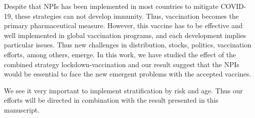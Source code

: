 Despite that NPIs has been implemented in most countries to mitigate COVID-19,
these strategies can not develop immunity.
Thus, vaccination becomes the primary pharmaceutical measure. However, this
vaccine has to be effective and well implemented in global vaccination
programs, and each development implies particular issues. Thus new challenges
in distribution, stocks, politics, vaccination efforts, among others, emerge.
In this work, we have studied the effect of the combined strategy
lockdown-vaccination and our result suggest that the NPIs would be essential to
face the new emergent problems with the accepted vaccines.

We see it very important to implement stratification by risk and age. Thus our
efforts will be directed in combination with the result presented in this
manuscript.